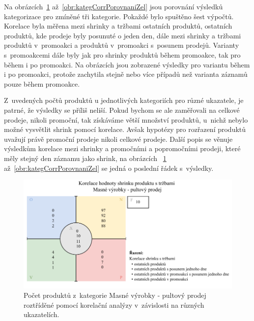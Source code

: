 Na obrázcích~\ref*{obr:kategCorrPorovnani} až~\ref*{obr:kategCorrPorovnaniZel} jsou porovnání výsledků kategorizace pro zmíněné tři kategorie. Pokaždé bylo spuštěno šest výpočtů. Korelace byla měřena mezi shrinky a tržbami ostatních produktů, ostatních produktů, kde prodeje byly posunuté o jeden den, dále mezi shrinky a tržbami produktů v~promoakci a produktů v~promoakci s~posunem prodejů. Varianty s~promoakcemi dále byly jak pro shrinky produktů během promoakce, tak pro během i po promoakci. Na obrázcích jsou zobrazené výsledky pro variantu během i po promoakci, protože zachytila stejně nebo více případů než varianta záznamů pouze během promoakce. 

Z~uvedených počtů produktů u jednotlivých kategoriích pro různé ukazatele, je patrné, že výsledky se příliš neliší. Pokud bychom se ale zaměřovali na celkové prodeje, nikoli promoční, tak získáváme větší množství produktů, u~nichž nebylo možné vysvětlit shrink pomocí korelace. Avšak hypotézy pro rozřazení produktů uvažují právě promoční prodeje nikoli celkové prodeje. Další popis se věnuje výsledkům korelace mezi shrinky a promočními a popromočními prodeji, které měly stejný den záznamu jako shrink, na obrázcích ~\ref*{obr:kategCorrPorovnani} až~\ref*{obr:kategCorrPorovnaniZel} se jedná o poslední řádek s~výsledky.

\begin{figure}[h!]
    \centering
    \captionsetup{justification=centering}
    \includegraphics[width=\textwidth]{obrazky/kor_maso.pdf}
    \caption{Počet produktů z~kategorie Masné výrobky - pultový prodej roztříděné pomocí korelační analýzy v~závislosti na různých ukazatelích.}
    \label{obr:kategCorrPorovnani}
\end{figure}

